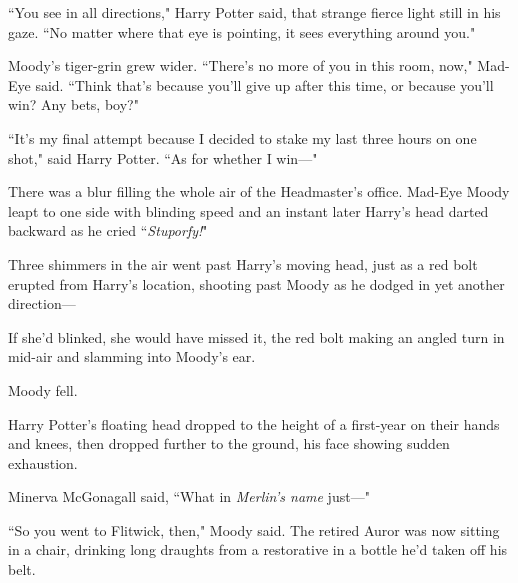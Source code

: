 ``You see in all directions," Harry Potter said, that strange fierce light still in his gaze. ``No matter where that eye is pointing, it sees everything around you."

Moody's tiger-grin grew wider. ``There's no more of you in this room, now," Mad-Eye said. ``Think that's because you'll give up after this time, or because you'll win? Any bets, boy?"

``It's my final attempt because I decided to stake my last three hours on one shot," said Harry Potter. ``As for whether I win—"

There was a blur filling the whole air of the Headmaster's office. Mad-Eye Moody leapt to one side with blinding speed and an instant later Harry's head darted backward as he cried ``\emph{Stuporfy!}"

Three shimmers in the air went past Harry's moving head, just as a red bolt erupted from Harry's location, shooting past Moody as he dodged in yet another direction—

If she'd blinked, she would have missed it, the red bolt making an angled turn in mid-air and slamming into Moody's ear.

Moody fell.

Harry Potter's floating head dropped to the height of a first-year on their hands and knees, then dropped further to the ground, his face showing sudden exhaustion.

Minerva McGonagall said, ``What in \emph{Merlin's name} just—"

\later

``So you went to Flitwick, then," Moody said. The retired Auror was now sitting in a chair, drinking long draughts from a restorative in a bottle he'd taken off his belt.

